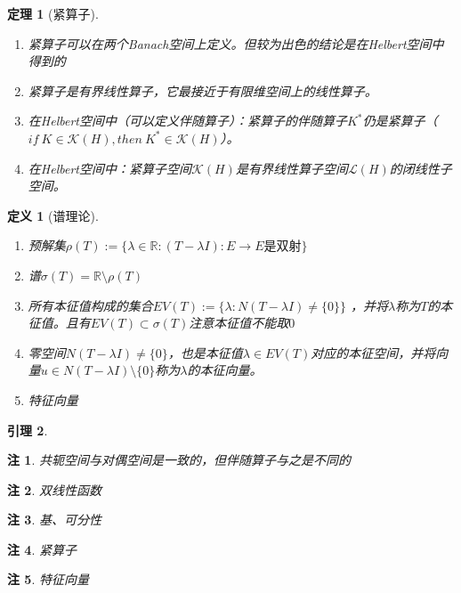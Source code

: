 \documentclass{article}                     %
\numberwithin{equation}{section}            %
\numberwithin{figure}{section}              %
\numberwithin{table}{section}               %
\newtheorem{theorem}{\indent 定理}[section] %
\newtheorem{lemma}[theorem]{\indent 引理}   %
\newtheorem{definition}{\indent 定义}[section]
\newtheorem{remark}{\indent 注}[section]
\begin{document}
\begin{theorem}[紧算子]
    \begin{enumerate}
        \item 紧算子可以在两个Banach空间上定义。但较为出色的结论是在Helbert空间中得到的
        \item 紧算子是有界线性算子，它最接近于有限维空间上的线性算子。
        \item 在Helbert空间中（可以定义伴随算子）：紧算子的伴随算子$K^{\ast }$仍是紧算子（$if \ K\in \mathcal{K}(H),then \ K^{\ast}\in \mathcal{K}(H)$）。
        \item 在Helbert空间中：紧算子空间$\mathcal{K}(H) $是有界线性算子空间$\mathcal{L}(H) $的闭线性子空间。
    \end{enumerate}
\end{theorem}



\begin{definition}[谱理论]
    \begin{enumerate}
        \item 预解集$\rho (T):=\{\lambda \in \mathbb{R} :(T-\lambda I):E\to E\mbox{是双射}\}$
        \item 谱$\sigma (T)=\mathbb{R}\setminus \rho (T)$
        \item 所有本征值构成的集合$EV(T):=\{\lambda:N(T-\lambda I)\neq \{0\}\}$ ，并将$\lambda $称为$T$的本征值。且有$EV(T)\subset \sigma (T)$注意本征值不能取$0$
        \item 零空间$N(T-\lambda I)\neq \{0\}$，也是本征值$\lambda \in EV(T)$对应的本征空间，并将向量$u\in N(T-\lambda I)\setminus \{0\}$称为$\lambda $的本征向量。
        \item 特征向量
    \end{enumerate}
\end{definition}

\begin{lemma}
    
\end{lemma}

\begin{remark}
    共轭空间与对偶空间是一致的，但伴随算子与之是不同的
\end{remark}

\begin{remark}
    双线性函数
\end{remark}
\begin{remark}
    基、可分性
\end{remark}
\begin{remark}
    紧算子
\end{remark}
\begin{remark}
    特征向量
\end{remark}
\end{document}
